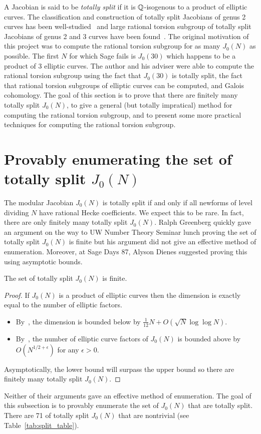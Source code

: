 \documentclass[11pt, proquest]{uwthesis}
\begin{document}
A Jacobian is said to be \emph{totally split} if it is $\mathbb{Q}$-isogenous to a
product of elliptic curves. The classification and construction of totally
split Jacobians of genus 2 curves has been
well-studied~\cite{bruin-doerksen:split_genus_two,kuhn:split_genus_two}
and large rational torsion subgroup of totally split Jacobians of genus 2 and 3
curves have been found~\cite{howe-leprevost-poonen:large}. The original
motivation of this project was to compute the rational torsion subgroup for as
many $J_0(N)$ as possible. The first $N$ for which Sage fails is $J_0(30)$
which happens to be a product of 3 elliptic curves. The author and his adviser
were able to compute the rational torsion subgroup using the fact that
$J_0(30)$ is totally split, the fact that rational torsion subgroups of
elliptic curves can be computed, and Galois cohomology. The goal of this
section is to prove that there are finitely many totally split $J_0(N)$, to
give a general (but totally impratical) method for computing the rational
torsion subgroup, and to present some more practical techniques for computing
the rational torsion subgroup.


\section{Provably enumerating the set of totally split $J_0(N)$}

The modular Jacobian $J_0(N)$ is totally split if and only if all newforms of
level dividing $N$ have rational Hecke coefficients. We expect this to be rare.
In fact, there are only finitely many totally split $J_0(N)$. Ralph Greenberg
quickly gave an argument on the way to UW Number Theory Seminar lunch proving
the set of totally split $J_0(N)$ is finite but his argument did not give an
effective method of enumeration. Moreover, at Sage Days 87, Alyson Dienes
suggested proving this using asymptotic bounds.
\begin{proposition}%
    \label{prop:totally_split}
    The set of totally split $J_0(N)$ is finite.
\end{proposition}
\begin{proof}
    If $J_0(N)$ is a product of elliptic curves then the dimension is
    exactly equal to the number of elliptic factors.
    \begin{itemize}
        \item
            By~\cite[Thm. 6]{martin:dimension}, the dimension is bounded below
            by $\frac{1}{12}N + O(\sqrt{N}\log\log N)$.
        \item
            By~\cite[Cor. 2]{brumer-silverman:number}, the number of elliptic
            curve factors of $J_0(N)$ is bounded above by $O(N^{1/2+\epsilon})$
            for any $\epsilon>0$.
    \end{itemize}
    Asymptotically, the lower bound will surpass the upper bound so there are
    finitely many totally split $J_0(N)$.
\end{proof}
Neither of their arguments gave an effective method of enumeration. The goal of
this subsection is to provably enumerate the set of $J_0(N)$ that are totally
split. There are 71 of totally split $J_0(N)$ that are nontrivial (see
Table~\ref{tab:split_table}).
\end{document}
